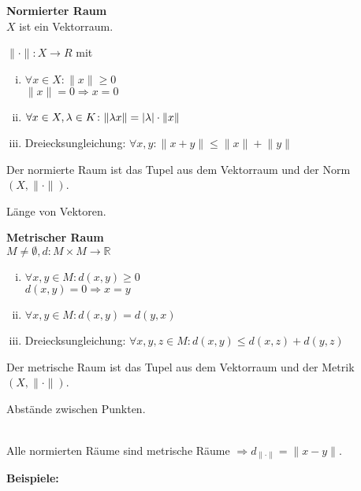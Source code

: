 \documentclass{article}
\begin{document}
\begin{minipage}[t]{.4\textwidth}
  \textbf{Normierter Raum} \\
  $X$ ist ein Vektorraum.

  $\lVert \cdot \rVert \colon X \to R$ mit
  \begin{enumerate}[(i)]
  \item $\forall x \in X \colon \lVert x \rVert \geq 0$ \\
    $\lVert x \rVert = 0 \Rightarrow x = 0$
  \item $\forall x \in X, \lambda \in K \colon \lVert \lambda x \rVert = \abs{\lambda} \cdot \lVert x \rVert$
  \item Dreiecksungleichung: $\forall x, y \colon \lVert x + y \rVert \leq \lVert x \rVert + \lVert y \rVert$
  \end{enumerate}
  Der normierte Raum ist das Tupel aus dem Vektorraum und der Norm $(X, \lVert \cdot \rVert)$.

  Länge von Vektoren.
\end{minipage} 
\hfill
\vrule
\hfill
\begin{minipage}[t]{.4\textwidth}
  \textbf{Metrischer Raum} \\
  $M \ne \emptyset, d \colon M \times M \to \mathbb{R}$
  \begin{enumerate}[(i)]
  \item $\forall x, y \in M \colon d(x, y) \geq 0$ \\
    $d(x, y) = 0 \Rightarrow x = y$
  \item $\forall x, y \in M \colon d(x, y) = d(y, x)$
  \item Dreiecksungleichung: $\forall x, y, z \in M \colon d(x, y) \leq d(x, z) + d(y, z)$
  \end{enumerate}
  Der metrische Raum ist das Tupel aus dem Vektorraum und der Metrik $(X, \lVert \cdot \rVert)$.

  Abstände zwischen Punkten.
\end{minipage} \\

Alle normierten Räume sind metrische Räume $\Rightarrow d_{\lVert \cdot \rVert} = \lVert x - y \rVert$.

\textbf{Beispiele:}
\end{document}
